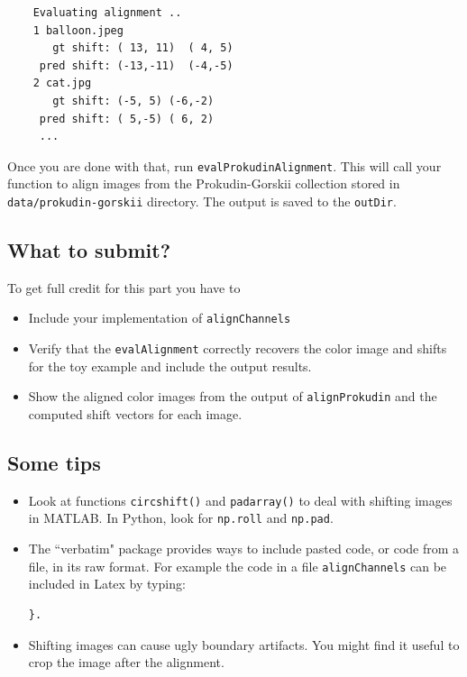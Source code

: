 \documentclass[10pt,letterpaper]{article}
\newcommand{\cmd}[1] {{\color{blue}\texttt{#1}}}
\begin{document}
\begin{verbatim}
    Evaluating alignment ..
    1 balloon.jpeg
	   gt shift: ( 13, 11)  ( 4, 5)
	 pred shift: (-13,-11)  (-4,-5)
    2 cat.jpg
	   gt shift: (-5, 5) (-6,-2)
	 pred shift: ( 5,-5) ( 6, 2)
     ...
\end{verbatim}
    
Once you are done with that, run \cmd{evalProkudinAlignment}. This will call your function to align images from the Prokudin-Gorskii collection stored in \cmd{data/prokudin-gorskii} directory. The output is saved to the \cmd{outDir}.


\subsection{What to submit?}
To get full credit for this part you have to 
\begin{itemize}
\item Include your implementation of \cmd{alignChannels}
\item Verify that the \cmd{evalAlignment} correctly recovers the color image and shifts for the toy example and include the output results.
\item Show the aligned color images from the output of \cmd{alignProkudin} and the computed shift vectors for each image.
\end{itemize}

\subsection{Some tips}
\begin{itemize}
\item Look at functions \cmd{circshift()} and \cmd{padarray()} to deal with shifting images in MATLAB.
In Python, look for \cmd{np.roll} and \cmd{np.pad}.

\item The ``verbatim" package provides ways to include pasted code, or code from a file, in its raw format. For example the code in a file \cmd{alignChannels} can be included in Latex by typing: 
\begin{verbatim}
}.
\end{verbatim}

\item Shifting images can cause ugly boundary artifacts. You might find it useful to crop the image after the alignment.
\end{itemize}
\end{document}
